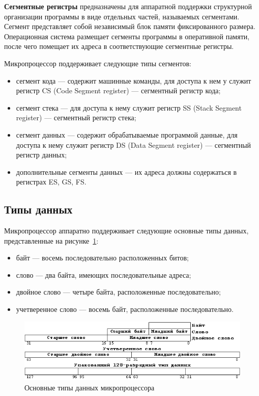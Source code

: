\textbf{Сегментные регистры} предназначены для аппаратной поддержки структурной
организации программы в виде отдельных частей, называемых сегментами.
Сегмент представляет собой независимый блок памяти фиксированного размера.
Операционная система размещает сегменты программы в оперативной памяти,
после чего помещает их адреса в соответствующие сегментные регистры.

Микропроцессор поддерживает следующие типы сегментов:

\begin{itemize}
\item сегмент кода --- содержит машинные команды, для доступа к нем у служит регистр CS
  (Code Segment register) --- сегментный регистр кода;
\item сегмент стека --- для доступа к нему служит регистр SS (Stack Segment register) ---
  сегментный регистр стека;
\item сегмент данных --- содержит обрабатываемые программой данные, для доступа к нему
  служит регистр DS (Data Segment register) --- сегментный регистр данных;
\item
  дополнительные сегменты данных --- их адреса должны содержаться в регистрах ES, GS, FS.
\end{itemize}

\subsection{Типы данных}

Микропроцессор аппаратно поддерживает следующие основные типы данных, представленные
на рисунке~\ref{fig:sizes}:

\begin{itemize}
\item байт --- восемь последовательно расположенных битов;
\item слово --- два байта, имеющих последовательные адреса;
\item двойное слово --- четыре байта, расположенные последовательно;
\item учетверенное слово --- восемь байт, расположенные последовательно.
\end{itemize}

\begin{figure}[htbp]
  \centering
  \includegraphics[width=150mm]{pic/sizes}
  \caption{Основные типы данных микропроцессора}\label{fig:sizes}
\end{figure}


